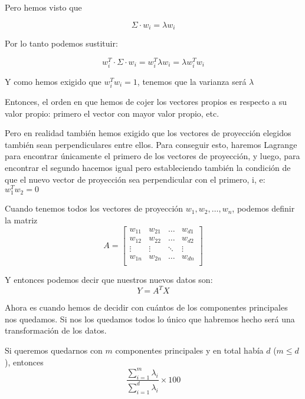 \documentclass[a4paper,10pt]{article}
\begin{document}
Pero hemos visto que

\begin{equation*}
  \Sigma \cdot w_i = \lambda w_i
\end{equation*}

Por lo tanto podemos sustituir:

\begin{equation*}
  w_i^T \cdot \Sigma \cdot w_i = w_i^T \lambda w_i = \lambda w_i^Tw_i
\end{equation*}

Y como hemos exigido que $w_i^Tw_i = 1$, tenemos que la varianza será $\lambda$

Entonces, el orden en que hemos de cojer los vectores propios es respecto a su valor propio: primero el vector con mayor valor propio, etc.

Pero en realidad también hemos exigido que los vectores de proyección elegidos también sean perpendiculares entre ellos. Para conseguir esto, haremos Lagrange para encontrar únicamente el primero de los vectores de proyección, y luego, para encontrar el segundo hacemos igual pero estableciendo también la condición de que el nuevo vector de proyección sea perpendicular con el primero, i, e: $w_1^Tw_2 = 0$

Cuando tenemos todos los vectores de proyección $w_1,w_2,\dots,w_n$, podemos definir la matriz
\begin{equation*}
  A =
  \begin{bmatrix}
    w_{11} & w_{21} & \dots & w_{d1} \\
    w_{12} & w_{22} & \dots & w_{d2} \\
    \vdots & \vdots & \ddots & \vdots \\
    w_{1n} & w_{2n} & \dots & w_{dn} \\
  \end{bmatrix}
\end{equation*}

Y entonces podemos decir que nuestros nuevos datos son:
\begin{equation*}
  Y = A^TX
\end{equation*}

Ahora es cuando hemos de decidir con cuántos de los componentes principales nos quedamos. Si nos los quedamos todos lo único que habremos hecho será una transformación de los datos.

Si queremos quedarnos con $m$ componentes principales y en total había $d$ ($m \leq d$), entonces
\begin{equation*}
  \frac
  {
    \sum_{i = 1}^{m} \lambda_i
  }
  {
    \sum_{i = 1}^{d} \lambda_i
  }
  \times 100
\end{equation*}
\end{document}
